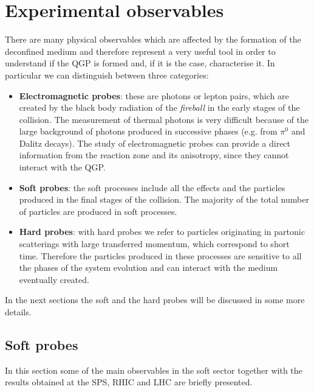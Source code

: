 \documentclass[b5paper,10pt,twoside,oldstyle,classica]{toptesi}
\begin{document}
\section{Experimental observables}
There are many physical observables which are affected by the formation of the deconfined medium and therefore represent a very useful tool in order to understand if the QGP is formed and, if it is the case, characterise it. In particular we can distinguish between three categories:
\begin{itemize}
 \item \textbf{Electromagnetic probes}: these are photons or lepton pairs, which are created by the black body radiation of the \textit{fireball} in the early stages of the collision. The measurement of thermal photons is very difficult because of the large background of photons produced in successive phases (e.g. from $\pi^0$ and Dalitz decays). The study of electromagnetic probes can provide a direct information from the reaction zone and its anisotropy, since they cannot interact with the QGP.  
 \item \textbf{Soft probes}: the soft processes include all the effects and the particles produced in the final stages of the collision.
 The majority of the total number of particles are produced in soft processes.  
 \item \textbf{Hard probes}: with hard probes we refer to particles originating in partonic scatterings with large transferred momentum, which correspond to short time. Therefore the particles produced in these processes are sensitive to all the phases of the system evolution and can interact with the medium eventually created.   
\end{itemize} 
In the next sections the soft and the hard probes will be discussed in some more details.
\subsection{Soft probes}
In this section some of the main observables in the soft sector together with the results obtained at the SPS, RHIC and LHC are briefly presented.
\end{document}
